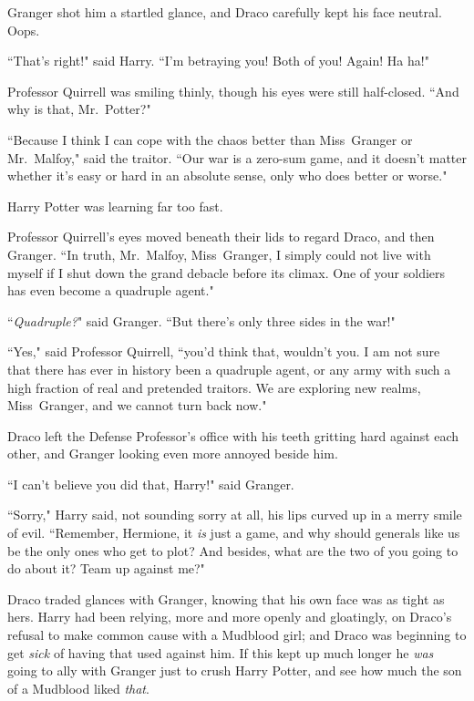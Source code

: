 Granger shot him a startled glance, and Draco carefully kept his face neutral. Oops.

``That's right!" said Harry. ``I'm betraying you! Both of you! Again! Ha ha!"

Professor Quirrell was smiling thinly, though his eyes were still half-closed. ``And why is that, Mr.~Potter?"

``Because I think I can cope with the chaos better than Miss~Granger or Mr.~Malfoy," said the traitor. ``Our war is a zero-sum game, and it doesn't matter whether it's easy or hard in an absolute sense, only who does better or worse."

Harry Potter was learning far too fast.

Professor Quirrell's eyes moved beneath their lids to regard Draco, and then Granger. ``In truth, Mr.~Malfoy, Miss~Granger, I simply could not live with myself if I shut down the grand debacle before its climax. One of your soldiers has even become a quadruple agent."

``\emph{Quadruple?}" said Granger. ``But there's only three sides in the war!"

``Yes," said Professor Quirrell, ``you'd think that, wouldn't you. I am not sure that there has ever in history been a quadruple agent, or any army with such a high fraction of real and pretended traitors. We are exploring new realms, Miss~Granger, and we cannot turn back now."

Draco left the Defense Professor's office with his teeth gritting hard against each other, and Granger looking even more annoyed beside him.

``I can't believe you did that, Harry!" said Granger.

``Sorry," Harry said, not sounding sorry at all, his lips curved up in a merry smile of evil. ``Remember, Hermione, it \emph{is} just a game, and why should generals like us be the only ones who get to plot? And besides, what are the two of you going to do about it? Team up against me?"

Draco traded glances with Granger, knowing that his own face was as tight as hers. Harry had been relying, more and more openly and gloatingly, on Draco's refusal to make common cause with a Mudblood girl; and Draco was beginning to get \emph{sick} of having that used against him. If this kept up much longer he \emph{was} going to ally with Granger just to crush Harry Potter, and see how much the son of a Mudblood liked \emph{that}.

\later

